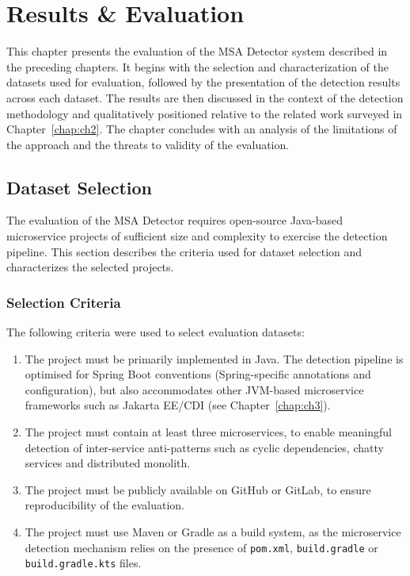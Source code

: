 \chapter{Results \& Evaluation}
\label{chap:ch5}

\par This chapter presents the evaluation of the MSA Detector system described in the preceding chapters. It begins with the selection and characterization of the datasets used for evaluation, followed by the presentation of the detection results across each dataset. The results are then discussed in the context of the detection methodology and qualitatively positioned relative to the related work surveyed in Chapter~\ref{chap:ch2}. The chapter concludes with an analysis of the limitations of the approach and the threats to validity of the evaluation.

\section{Dataset Selection}
\label{sec:dataset-selection}

\par The evaluation of the MSA Detector requires open-source Java-based microservice projects of sufficient size and complexity to exercise the detection pipeline. This section describes the criteria used for dataset selection and characterizes the selected projects.

\subsection{Selection Criteria}
\label{subsec:selection-criteria}

\par The following criteria were used to select evaluation datasets:

\begin{enumerate}
    \item The project must be primarily implemented in Java. The detection pipeline is optimised for Spring Boot conventions (Spring-specific annotations and configuration), but also accommodates other JVM-based microservice frameworks such as Jakarta EE/CDI (see Chapter~\ref{chap:ch3}).
    \item The project must contain at least three microservices, to enable meaningful detection of inter-service anti-patterns such as cyclic dependencies, chatty services and distributed monolith.
    \item The project must be publicly available on GitHub or GitLab, to ensure reproducibility of the evaluation.
    \item The project must use Maven or Gradle as a build system, as the microservice detection mechanism relies on the presence of \texttt{pom.xml}, \texttt{build.gradle} or \texttt{build.gradle.kts} files.
\end{enumerate}

